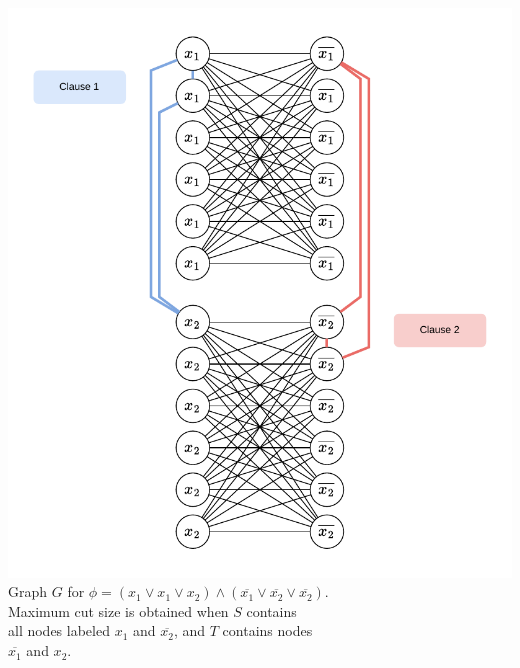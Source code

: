 \documentclass[11pt]{article}
\begin{document}
\begin{center}
\includegraphics[scale=1.0]{Figures/Problem7.27a.pdf} \\
Graph $G$ for $\phi = (x_1 \vee x_1 \vee x_2) \wedge (\overline{x_1} \vee \overline{x_2} \vee \overline{x_2})$. \\ Maximum cut size is obtained  when $S$ contains \\ all nodes labeled $x_1$ and $\overline{x_2}$, and $T$ contains nodes \\ $\overline{x_1}$ and $x_2$.
\end{center}
\end{document}
